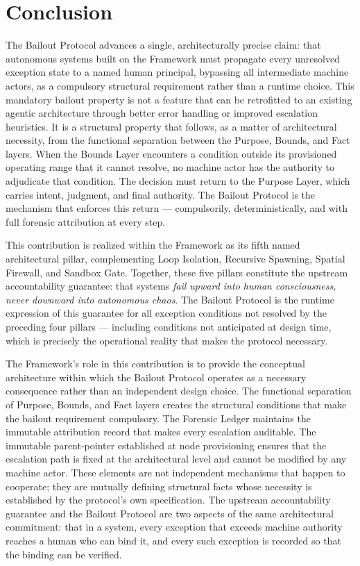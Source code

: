 \section{Conclusion}\label{sec:conclusion}

The Bailout Protocol advances a single, architecturally precise claim: that autonomous systems built on the \bxthree{} Framework must propagate every unresolved exception state to a named human principal, bypassing all intermediate machine actors, as a compulsory structural requirement rather than a runtime choice. This mandatory bailout property is not a feature that can be retrofitted to an existing agentic architecture through better error handling or improved escalation heuristics. It is a structural property that follows, as a matter of architectural necessity, from the functional separation between the Purpose, Bounds, and Fact layers. When the Bounds Layer encounters a condition outside its provisioned operating range that it cannot resolve, no machine actor has the authority to adjudicate that condition. The decision must return to the Purpose Layer, which carries intent, judgment, and final authority. The Bailout Protocol is the mechanism that enforces this return --- compulsorily, deterministically, and with full forensic attribution at every step.

This contribution is realized within the \bxthree{} Framework as its fifth named architectural pillar, complementing Loop Isolation, Recursive Spawning, Spatial Firewall, and Sandbox Gate. Together, these five pillars constitute the upstream accountability guarantee: that \bxthree{} systems \emph{fail upward into human consciousness, never downward into autonomous chaos}. The Bailout Protocol is the runtime expression of this guarantee for all exception conditions not resolved by the preceding four pillars --- including conditions not anticipated at design time, which is precisely the operational reality that makes the protocol necessary.

The \bxthree{} Framework's role in this contribution is to provide the conceptual architecture within which the Bailout Protocol operates as a necessary consequence rather than an independent design choice. The functional separation of Purpose, Bounds, and Fact layers creates the structural conditions that make the bailout requirement compulsory. The Forensic Ledger maintains the immutable attribution record that makes every escalation auditable. The immutable parent-pointer established at node provisioning ensures that the escalation path is fixed at the architectural level and cannot be modified by any machine actor. These elements are not independent mechanisms that happen to cooperate; they are mutually defining structural facts whose necessity is established by the protocol's own specification. The upstream accountability guarantee and the Bailout Protocol are two aspects of the same architectural commitment: that in a \bxthree{} system, every exception that exceeds machine authority reaches a human who can bind it, and every such exception is recorded so that the binding can be verified.

